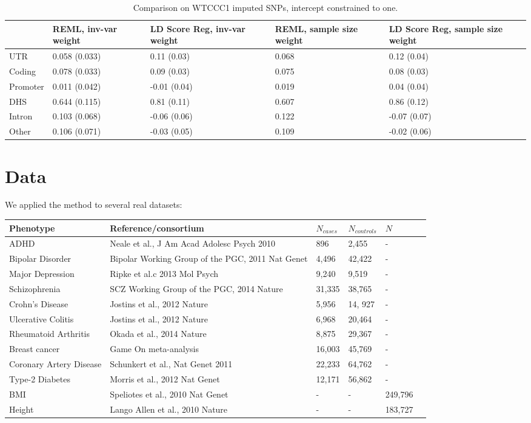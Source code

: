 \documentclass[11pt]{article}
\begin{document}
\begin{table}[H]
\begin{center}
\begin{tabular}[h]{ p{2.5cm} | l p{2.5cm}  p{2.5cm}  p{2.5cm}}
& REML, inv-var weight & LD Score Reg, inv-var weight & REML, sample size weight & LD Score Reg, sample size weight\\
\hline
UTR & 0.058 (0.033) & 0.11 (0.03) & 0.068 & 0.12 (0.04)\\
Coding & 0.078 (0.033) & 0.09 (0.03) & 0.075 & 0.08 (0.03)\\
Promoter & 0.011 (0.042) & -0.01 (0.04) & 0.019 & 0.04 (0.04)\\
DHS & 0.644 (0.115) & 0.81 (0.11) & 0.607 & 0.86 (0.12)\\
Intron & 0.103 (0.068) & -0.06 (0.06) & 0.122 & -0.07 (0.07)\\
Other & 0.106 (0.071) & -0.03 (0.05) & 0.109 & -0.02 (0.06)\\
\end{tabular}
\caption{Comparison on WTCCC1 imputed SNPs, intercept constrained to one.}
\end{center}
\end{table}

\section{Data}
We applied the method to several real datasets:
\begin{center}
\begin{tabular}{llllll}
Phenotype & Reference/consortium & $N_{cases}$ & $N_{controls} $ & $N$ \\
\hline
ADHD & Neale et al., J Am Acad Adolesc Psych 2010 & 896 & 2,455 & - \\
Bipolar Disorder & Bipolar Working Group of the PGC, 2011 Nat Genet & 4,496 & 42,422 & -\\
Major Depression & Ripke et al.c 2013 Mol Psych &9,240 & 9,519 & -\\
Schizophrenia  & SCZ Working Group of the PGC, 2014 Nature & 31,335 & 38,765 & -\\
Crohn's Disease & Jostins et al., 2012 Nature & 5,956 & 14, 927 & -\\
Ulcerative Colitis & Jostins et al., 2012 Nature & 6,968 & 20,464 & -\\
Rheumatoid Arthritis & Okada et al., 2014 Nature & 8,875 &29,367 & -\\
Breast cancer & Game On meta-analysis & 16,003 & 45,769 & - \\
Coronary Artery Disease & Schunkert et al., Nat Genet 2011 &22,233 & 64,762 & - \\
Type-2 Diabetes& Morris et al., 2012 Nat Genet & 12,171 & 56,862 & - \\
BMI & Speliotes et al., 2010 Nat Genet & - & - & 249,796 \\
Height & Lango Allen et al., 2010 Nature & - & - & 183,727\\
\end{tabular}
\end{center}
\end{document}
